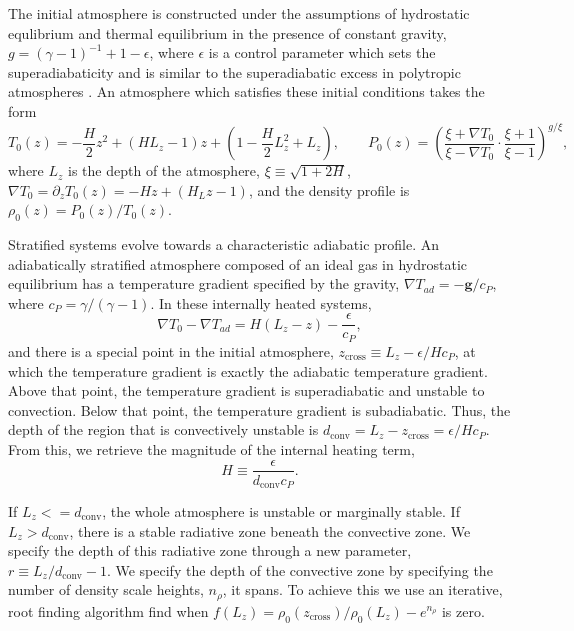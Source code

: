 \documentclass[twocolumn]{aastex61}
\newcommand{\grad}{\ensuremath{\nabla}}
\begin{document}
The initial atmosphere is constructed under the assumptions of hydrostatic equlibrium
and thermal equilibrium in the presence of constant gravity, $g = (\gamma - 1)^{-1} + 1 - \epsilon$,
where $\epsilon$ is a control parameter which sets the superadiabaticity and is similar to
the superadiabatic excess in polytropic atmospheres \cite{anders&brown2017, graham1975}.
An atmosphere which satisfies these initial conditions takes the form
\begin{equation}
T_0(z) = -\frac{H}{2} z^2 + (H L_z - 1) z + \left(1 - \frac{H}{2}L_z^2 + L_z\right),
\qquad P_0(z) = \left(\frac{\xi + \grad T_0}{\xi - \grad T_0} \cdot\frac{\xi + 1}{\xi - 1}\right)^{g/\xi},
\end{equation}
where $L_z$ is the depth of the atmosphere, $\xi \equiv \sqrt{1 + 2H}$, 
$\grad T_0 = \partial_z T_0(z) = -H z + (H_Lz - 1)$,
and the density profile is $\rho_0(z) = P_0(z)/T_0(z)$.

Stratified systems evolve towards a characteristic adiabatic profile.  An adiabatically
stratified atmosphere composed of an ideal gas in hydrostatic equilibrium has a
temperature gradient specified by the gravity, $\grad T_{ad} = -\bm{g} / c_P$, where
$c_P = \gamma/(\gamma-1)$.  In these internally heated systems,
\begin{equation}
\grad T_0 - \grad T_{ad} = H(L_z - z) - \frac{\epsilon}{c_P},
\end{equation}
and there is a special point in the initial atmosphere, $z_{\text{cross}} \equiv L_z - \epsilon / H c_P$,
at which the temperature gradient is exactly the adiabatic temperature gradient.  Above that point,
the temperature gradient is superadiabatic and unstable to convection.  Below that point,
the temperature gradient is subadiabatic.  Thus, the depth of the region that is convectively
unstable is $d_{\text{conv}} = L_z - z_{\text{cross}} = \epsilon / H c_P$.  From this,
we retrieve the magnitude of the internal heating term,
\begin{equation}
H \equiv \frac{\epsilon}{d_{\text{conv}} c_P}.
\end{equation}

If $L_z <= d_{\text{conv}}$, the whole atmosphere is unstable or marginally stable.
If $L_z > d_{\text{conv}}$, there is a stable radiative zone beneath the convective
zone.  We specify the depth of this radiative zone through a new parameter,
$r \equiv L_z/d_{\text{conv}} - 1$.  We specify the depth of the convective zone by
specifying the number of density scale heights, $n_\rho$, it spans.  To achieve this we
use an iterative, root finding algorithm find when
$f(L_z) = \rho_0(z_{\text{cross}})/\rho_0(L_z) -  e^{n_\rho}$ is zero.
\end{document}
